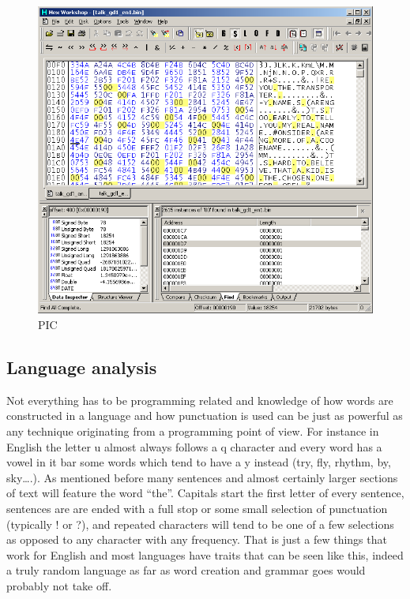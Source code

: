 \documentclass[
]{book}
\begin{document}
\begin{figure}
\centering
\includegraphics{images/96_home_fast6191_romhackingguide_unrenamed_file___ders_romhackingguidertextfrequencyanalysis2.png}
\caption{PIC}
\end{figure}

\hypertarget{language-analysis}{%
\subsection{Language analysis}\label{language-analysis}}

Not everything has to be programming related and knowledge of how words are constructed in a language and how punctuation is used can be just as powerful as any technique originating from a programming point of view. For instance in English the letter u almost always follows a q character and every word has a vowel in it bar some words which tend to have a y instead (try, fly, rhythm, by, sky\ldots.). As mentioned before many sentences and almost certainly larger sections of text will feature the word ``the''. Capitals start the first letter of every sentence, sentences are are ended with a full stop or some small selection of punctuation (typically ! or ?), and repeated characters will tend to be one of a few selections as opposed to any character with any frequency. That is just a few things that work for English and most languages have traits that can be seen like this, indeed a truly random language as far as word creation and grammar goes would probably not take off.
\end{document}
